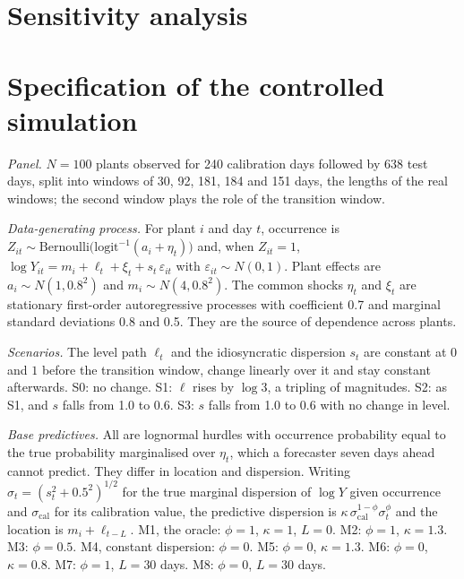 \section{Sensitivity analysis}
\label{app:sens}



\section{Specification of the controlled simulation}
\label{app:sim}

\emph{Panel.} $N=100$ plants observed for 240 calibration days followed by 638 test days, split into windows of 30, 92, 181, 184 and 151 days, the lengths of the real windows; the second window plays the role of the transition window.

\emph{Data-generating process.} For plant $i$ and day $t$, occurrence is $Z_{it}\sim\mathrm{Bernoulli}\big(\mathrm{logit}^{-1}(a_i+\eta_t)\big)$ and, when $Z_{it}=1$, $\log Y_{it}=m_i+\ell_t+\xi_t+s_t\,\varepsilon_{it}$ with $\varepsilon_{it}\sim N(0,1)$. Plant effects are $a_i\sim N(1,0.8^2)$ and $m_i\sim N(4,0.8^2)$. The common shocks $\eta_t$ and $\xi_t$ are stationary first-order autoregressive processes with coefficient 0.7 and marginal standard deviations 0.8 and 0.5. They are the source of dependence across plants.

\emph{Scenarios.} The level path $\ell_t$ and the idiosyncratic dispersion $s_t$ are constant at $0$ and $1$ before the transition window, change linearly over it and stay constant afterwards. S0: no change. S1: $\ell$ rises by $\log 3$, a tripling of magnitudes. S2: as S1, and $s$ falls from 1.0 to 0.6. S3: $s$ falls from 1.0 to 0.6 with no change in level.

\emph{Base predictives.} All are lognormal hurdles with occurrence probability equal to the true probability marginalised over $\eta_t$, which a forecaster seven days ahead cannot predict. They differ in location and dispersion. Writing $\sigma_t=(s_t^2+0.5^2)^{1/2}$ for the true marginal dispersion of $\log Y$ given occurrence and $\sigma_{\mathrm{cal}}$ for its calibration value, the predictive dispersion is $\kappa\,\sigma_{\mathrm{cal}}^{1-\phi}\sigma_t^{\phi}$ and the location is $m_i+\ell_{t-L}$. M1, the oracle: $\phi=1$, $\kappa=1$, $L=0$. M2: $\phi=1$, $\kappa=1.3$. M3: $\phi=0.5$. M4, constant dispersion: $\phi=0$. M5: $\phi=0$, $\kappa=1.3$. M6: $\phi=0$, $\kappa=0.8$. M7: $\phi=1$, $L=30$ days. M8: $\phi=0$, $L=30$ days.

